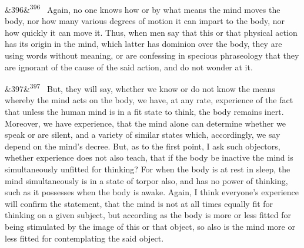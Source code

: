 \documentclass[12pt]{article}
\newcommand{\para}[1][]{\par\noindent\ifx&#1&\else\textsuperscript{\footnotesize #1}~\fi}
\begin{document}
\para[396] Again, no one knows how or by what means the mind moves the body, nor how many various degrees of motion it can impart to the body, nor how quickly it can move it. Thus, when men say that this or that physical action has its origin in the mind, which latter has dominion over the body, they are using words without meaning, or are confessing in specious phraseology that they are ignorant of the cause of the said action, and do not wonder at it.

\para[397] But, they will say, whether we know or do not know the means whereby the mind acts on the body, we have, at any rate, experience of the fact that unless the human mind is in a fit state to think, the body remains inert. Moreover, we have experience, that the mind alone can determine whether we speak or are silent, and a variety of similar states which, accordingly, we say depend on the mind's decree. But, as to the first point, I ask such objectors, whether experience does not also teach, that if the body be inactive the mind is simultaneously unfitted for thinking? For when the body is at rest in sleep, the mind simultaneously is in a state of torpor also, and has no power of thinking, such as it possesses when the body is awake. Again, I think everyone's experience will confirm the statement, that the mind is not at all times equally fit for thinking on a given subject, but according as the body is more or less fitted for being stimulated by the image of this or that object, so also is the mind more or less fitted for contemplating the said object.
\end{document}

